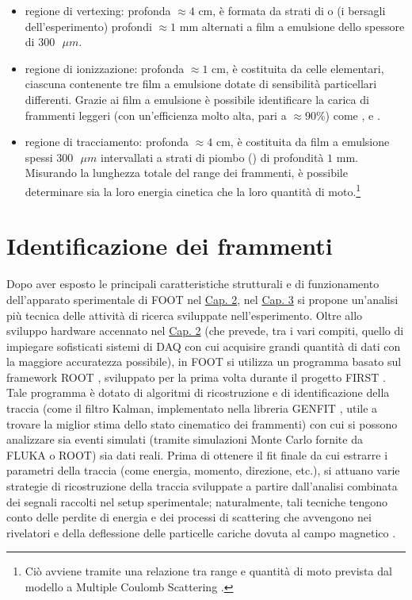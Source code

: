 \documentclass[12pt,a4paper,twoside]{report}
\begin{document}
	\begin{itemize}
		\item regione di vertexing: profonda $\approx4\mbox{ cm}$, è formata da strati di  o  (i bersagli dell'esperimento) profondi $\approx1\mbox{ mm}$ alternati a film a emulsione dello spessore di $300\mbox{ }\mu{m}$.
		\item regione di ionizzazione: profonda $\approx1\mbox{ cm}$, è costituita da celle elementari, ciascuna contenente tre film a emulsione dotate di sensibilità particellari differenti. Grazie ai film a emulsione è possibile identificare la carica di frammenti leggeri (con un'efficienza molto alta, pari a $\approx90\%$) come ,  e  \cite{deLellisConference}.
		\item regione di tracciamento: profonda $\approx4\mbox{ cm}$, è costituita da film a emulsione spessi $300\mbox{ }\mu{m}$ intervallati a strati di piombo () di profondità $1\mbox{ mm}$. Misurando la lunghezza totale del range dei frammenti, è possibile determinare sia la loro energia cinetica che la loro quantità di moto.\footnote{Ciò avviene tramite una relazione tra range e quantità di moto prevista dal modello a Multiple Coulomb Scattering \cite{articleAgafonova,DESERIO2003539}.}
	\end{itemize}
	
	\chapter{Identificazione dei frammenti}\label{cap:3}
	Dopo aver esposto le principali caratteristiche strutturali e di funzionamento dell'apparato sperimentale di FOOT nel \hyperref[cap:2]{Cap. 2}, nel \hyperref[cap:3]{Cap. 3} si propone un'analisi più tecnica delle attività di ricerca sviluppate nell'esperimento. Oltre allo sviluppo hardware accennato nel \hyperref[cap:2]{Cap. 2} (che prevede, tra i vari compiti, quello di impiegare sofisticati sistemi di DAQ con cui acquisire grandi quantità di dati con la maggiore accuratezza possibile), in FOOT si utilizza un programma basato sul framework ROOT \cite{rene_brun}, sviluppato per la prima volta durante il progetto FIRST \cite{foot_cdr}. Tale programma è dotato di algoritmi di ricostruzione e di identificazione della traccia (come il filtro Kalman, implementato nella libreria GENFIT \cite{Rauch_2015}, utile a trovare la miglior stima dello stato cinematico dei frammenti) con cui si possono analizzare sia eventi simulati (tramite simulazioni Monte Carlo fornite da FLUKA o ROOT) sia dati reali. Prima di ottenere il fit finale da cui estrarre i parametri della traccia (come energia, momento, direzione, etc.), si attuano varie strategie di ricostruzione della traccia sviluppate a partire dall'analisi combinata dei segnali raccolti nel setup sperimentale; naturalmente, tali tecniche tengono conto delle perdite di energia e dei processi di scattering che avvengono nei rivelatori e della deflessione delle particelle cariche dovuta al campo magnetico \cite{ridolfiArticle}.
	
\end{document}
